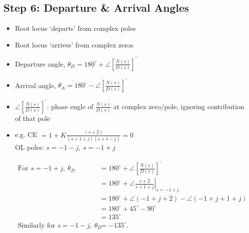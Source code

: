 \documentclass[a4paper]{article}
\begin{document}
\subsection{Step 6: Departure \& Arrival Angles}
\begin{itemize}
    \item Root locus `departs' from complex poles
    \item Root locus `arrives' from complex zeros
    \item Departure angle, $\theta_D = 180^\circ +\angle \left[\displaystyle\frac{N(s)}{D(s)}\right]^{'}$
    \item Arrival angle, $\theta_A = 180^\circ -\angle \left[\displaystyle\frac{N(s)}{D(s)}\right]^{'}$
    \item $\angle \left[\displaystyle\frac{N(s)}{D(s)}\right]^{'}$: phase engle of $\displaystyle\frac{N(s)}{D(s)}$ at complex zero/pole, ignoring contribution of that pole
    \item e.g. CE $=1+K\displaystyle\frac{(s+2)}{(s+1+j)(s+1-j)} = 0$\vspace{0.2cm}\\
    OL poles: $s = -1-j,\ s = -1+j$\vspace{-0.2cm}\\
    \begin{minipage}{0.5\textwidth}
    \begin{align*}
        \text{For }s = -1+j,\ \theta_D &= 180^\circ +\angle\left[\frac{N(s)}{D(s)}\right]^{'}\\
        &= 180^\circ + \angle\left.\frac{s+2}{s+1+j}\right|_{s=-1+j}\\
        &= 180^\circ + \angle(-1+j+2)-\angle(-1+j+1+j)\\
        &= 180^\circ + 45^\circ-90^\circ\\
        &= 135^\circ\\
        \text{Similarly for }s = -1-j,\ \theta_D &= -135^\circ.
    \end{align*}
    \end{minipage}
    \begin{minipage}{0.5\textwidth}
    \begin{center}

\begin{tikzpicture}[x=0.75pt,y=0.75pt,yscale=-1,xscale=1]


\end{tikzpicture}
\end{center}
\end{minipage}
\end{itemize}
\end{document}
